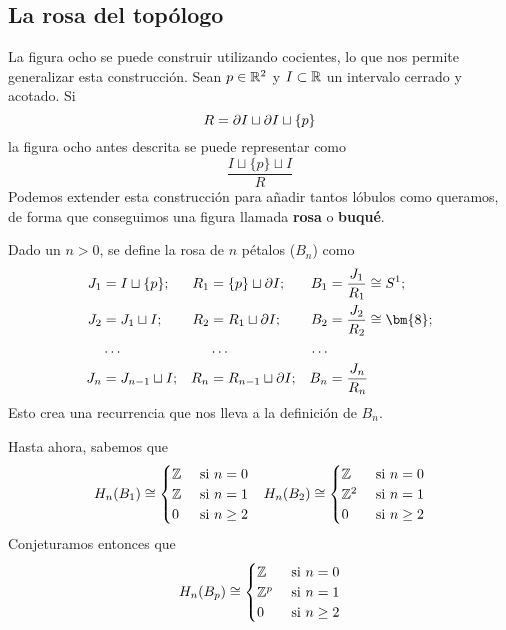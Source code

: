 \subsection{La rosa del topólogo}
La figura ocho se puede construir utilizando cocientes, lo que nos permite
generalizar esta construcción. Sean $p \in \mathbb{R}^2$ y $I \subset \mathbb{R}$
un intervalo cerrado y acotado. Si
\[R=\partial I\sqcup \partial I\sqcup \{p\}\]
la figura ocho antes descrita se puede representar como
\[\frac{I\sqcup\{p\}\sqcup I}{R}\]
Podemos extender esta construcción para añadir tantos lóbulos como queramos,
de forma que conseguimos una figura llamada \textbf{rosa} o \textbf{buqué}.

Dado un $n > 0$, se define la rosa de $n$ pétalos ($B_n$) como
\begin{align*}
J_1	&=I\sqcup \{p\}; 	& R_1	&=\{p\}\sqcup \p I;		&
B_1	&=\frac{J_1}{R_1}\cong S^1;\\
J_2	&=J_1\sqcup I;		& R_2	&=R_1\sqcup \p I; 		&
B_2	&=\frac{J_2}{R_2}\cong \bm{8};\\
	&\hdots				& 		&\hdots					&
\hdots\\
J_n	&=J_{n-1}\sqcup I;	& R_n	&=R_{n-1}\sqcup \p I;	&
B_n	&=\frac{J_n}{R_n}
\end{align*}
Esto crea una recurrencia que nos lleva a la definición de $B_n$.

Hasta ahora, sabemos que
\begin{align*}
H_n(B_1)\cong
\begin{cases}
\mathbb{Z}	&\mbox{ si $n =0$}\\
\mathbb{Z}	&\mbox{ si $n =1$}\\
0    	&\mbox{ si $n \geq 2$}
\end{cases}
&&
H_n(B_2)\cong
\begin{cases}
\mathbb{Z}		&\mbox{ si $n =0$}\\
\mathbb{Z}^2 	&\mbox{ si $n =1$}\\
0		    &\mbox{ si $n \geq 2$}
\end{cases}
\end{align*}
Conjeturamos entonces que
\[H_n(B_p)\cong
\begin{cases}
\mathbb{Z}		&\mbox{ si $n =0$}\\
\mathbb{Z}^p	&\mbox{ si $n =1$}\\
0     &\mbox{ si $n \geq 2$}
\end{cases}\]


